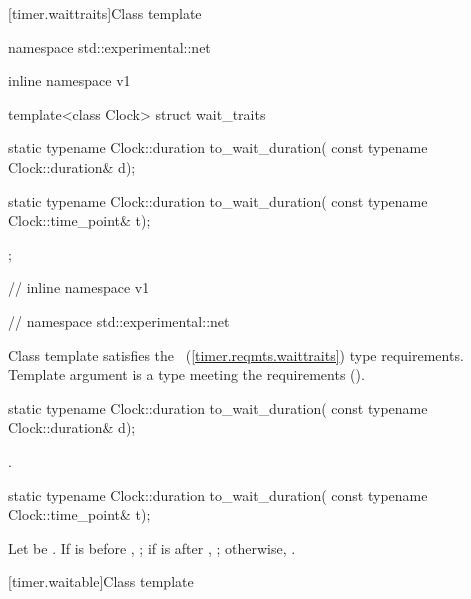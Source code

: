 [timer.waittraits]{Class template }

%
\begin{codeblock}
namespace std::experimental::net {
inline namespace v1 {

  template<class Clock>
  struct wait_traits
  {
    static typename Clock::duration to_wait_duration(
      const typename Clock::duration& d);

    static typename Clock::duration to_wait_duration(
      const typename Clock::time_point& t);
  };

} // inline namespace v1
} // namespace std::experimental::net
\end{codeblock}

\pnum
Class template  satisfies the ~(\ref{timer.reqmts.waittraits}) type requirements. Template argument  is a type meeting the  requirements ().

%
\begin{itemdecl}
static typename Clock::duration to_wait_duration(
  const typename Clock::duration& d);
\end{itemdecl}

\begin{itemdescr}
\pnum
\returns {}.
\end{itemdescr}

%
\begin{itemdecl}
static typename Clock::duration to_wait_duration(
  const typename Clock::time_point& t);
\end{itemdecl}

\begin{itemdescr}
\pnum
\returns Let  be . If  is before , ; if  is after , ; otherwise, .
\end{itemdescr}


[timer.waitable]{Class template }

